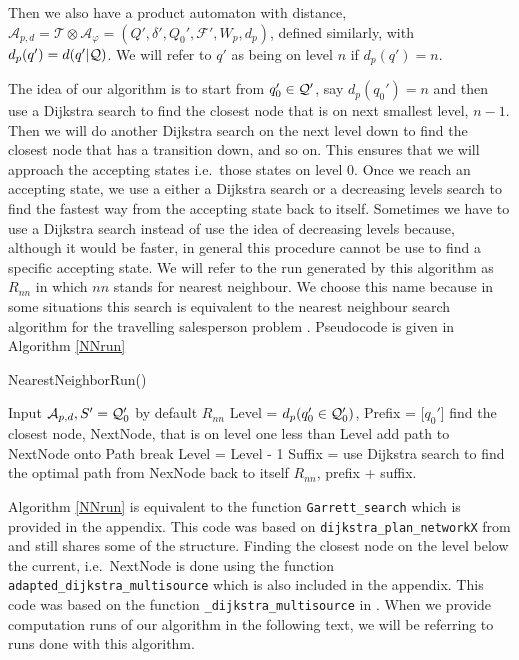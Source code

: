 Then we also have a product automaton with distance, $\mathcal{A}_{p,d} = \mathcal{T} \otimes \mathcal{A}_\varphi = (Q', \delta', Q_0', \mathcal{F}', W_p, d_p)$, defined similarly, with $d_p(q') = d(q'|\mathcal{Q})$. We will refer to $q'$ as being on level $n$ if $d_p(q') = n$.

The idea of our algorithm is to start from $q_0' \in \mathcal{Q}'$, say $d_p(q_0')=n$ and then use a Dijkstra search to find the closest node that is on next smallest level, $n-1$. Then we will do another Dijkstra search on the next level down to find the closest node that has a transition down, and so on. This ensures that we will approach the accepting states i.e.\ those states on level 0. Once we reach an accepting state, we use a either a Dijkstra search or a decreasing levels search to find the fastest way from the accepting state back to itself. Sometimes we have to use a Dijkstra search instead of use the idea of decreasing levels because, although it would be faster, in general this procedure cannot be use to find a specific accepting state. We will refer to the run generated by this algorithm as $R_{nn}$ in which $nn$ stands for nearest neighbour. We choose this name because in some situations this search is equivalent to the nearest neighbour search algorithm for the travelling salesperson problem \cite{hoffman86}. Pseudocode is given in Algorithm \ref{NNrun}

\begin{algorithm}
\caption{NearestNeighborRun()}\label{NNrun}
\begin{algorithmic}[1]
\Require Input $\mathcal{A}_{p,d}, S' = \mathcal{Q}_0'$ by default
\Ensure $R_{nn}$
\State Level = $d_p(q_0' \in \mathcal{Q}_0')$, Prefix = [$q_0'$]
\State find the closest node, NextNode, that is on level one less than Level %
\State	add path to NextNode onto Path
\State break
\EndIf
\State Level = Level - 1	
\EndWhile
\State Suffix = use Dijkstra search to find the optimal path from NexNode back to itself %
\State $R_{nn}$, prefix + suffix.
\end{algorithmic}
\end{algorithm}

Algorithm \ref{NNrun} is equivalent to the function \texttt{Garrett\_search} which is provided in the appendix. This code was based on \texttt{dijkstra\_plan\_networkX} from \cite{pMasGit} and still shares some of the structure. Finding the closest node on the level below the current, i.e.\ NextNode is done using the function \texttt{adapted\_dijkstra\_multisource} which is also included in the appendix. This code was based on the function  \texttt{\_dijkstra\_multisource} in \cite{schult08}. When we provide computation runs of our algorithm in the following text, we will be referring to runs done with this algorithm. %

